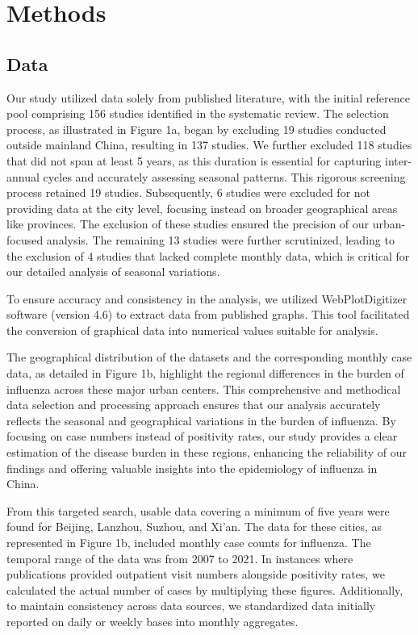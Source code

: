 \documentclass{article}
\begin{document}
\section{Methods}
\subsection{Data}
Our study utilized data solely from published literature, with the initial reference pool comprising 156 studies identified in the systematic review. The selection process, as illustrated in Figure 1a, began by excluding 19 studies conducted outside mainland China, resulting in 137 studies. We further excluded 118 studies that did not span at least 5 years, as this duration is essential for capturing inter-annual cycles and accurately assessing seasonal patterns. This rigorous screening process retained 19 studies. Subsequently, 6 studies were excluded for not providing data at the city level, focusing instead on broader geographical areas like provinces. The exclusion of these studies ensured the precision of our urban-focused analysis. The remaining 13 studies were further scrutinized, leading to the exclusion of 4 studies that lacked complete monthly data, which is critical for our detailed analysis of seasonal variations. 

To ensure accuracy and consistency in the analysis, we utilized WebPlotDigitizer software (version 4.6) to extract data from published graphs. This tool facilitated the conversion of graphical data into numerical values suitable for analysis. 

The geographical distribution of the datasets and the corresponding monthly case data, as detailed in Figure 1b, highlight the regional differences in the burden of influenza across these major urban centers. This comprehensive and methodical data selection and processing approach ensures that our analysis accurately reflects the seasonal and geographical variations in the burden of influenza. By focusing on case numbers instead of positivity rates, our study provides a clear estimation of the disease burden in these regions, enhancing the reliability of our findings and offering valuable insights into the epidemiology of influenza in China.

From this targeted search, usable data covering a minimum of five years were found for Beijing, Lanzhou, Suzhou, and Xi'an. The data for these cities, as represented in Figure 1b, included monthly case counts for influenza. The temporal range of the data was from 2007 to 2021. In instances where publications provided outpatient visit numbers alongside positivity rates, we calculated the actual number of cases by multiplying these figures. Additionally, to maintain consistency across data sources, we standardized data initially reported on daily or weekly bases into monthly aggregates.
\end{document}
